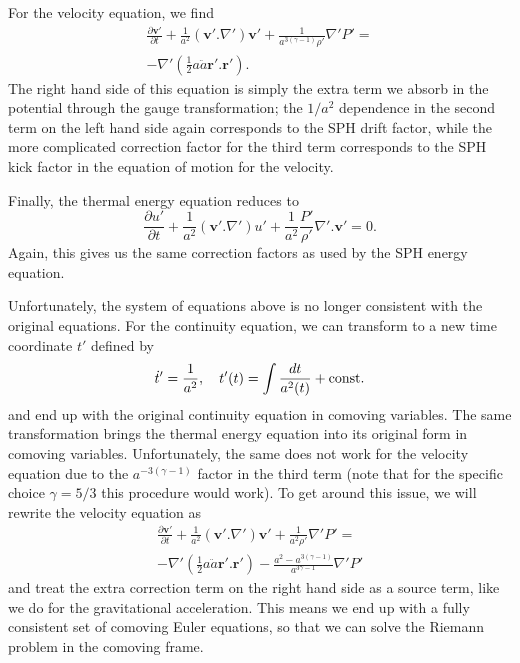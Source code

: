 For the velocity equation, we find
\begin{multline}
\frac{\partial{} \mathbf{v}'}{\partial{} t} + \frac{1}{a^2} \left( \mathbf{v}' .
\nabla{}' \right) \mathbf{v}' + \frac{1}{a^{3(\gamma{} - 1)}\rho{}'}
\nabla{}' P' = \\
- \nabla{}' \left( \frac{1}{2} a \ddot{a} \mathbf{r}'.\mathbf{r}'
\right).
\end{multline}
The right hand side of this equation is simply the extra term we absorb in the
potential through the gauge transformation; the $1/a^2$ dependence in the
second term on the left hand side again corresponds to the SPH drift factor,
while the more complicated correction factor for the third term corresponds
to the SPH kick factor in the equation of motion for the velocity.

Finally, the thermal energy equation reduces to
\begin{equation}
\frac{\partial{} u'}{\partial{} t} + \frac{1}{a^2} \left( \mathbf{v}' .
\nabla{}' \right) u' + \frac{1}{a^2} \frac{P'}{\rho{}'} \nabla{}' . \mathbf{v}'
= 0.
\end{equation}
Again, this gives us the same correction factors as used by the SPH energy
equation.

Unfortunately, the system of equations above is no longer consistent with the
original equations. For the continuity equation, we can transform to a new
time coordinate $t'$ defined by
\begin{equation}
\dot{t}' = \frac{1}{a^2}, \quad{} t'(t) = \int \frac{dt}{a^2(t)} + {\rm{}const.}
\end{equation}
and end up with the original continuity equation in comoving variables. The
same transformation brings the thermal energy equation into its original form
in comoving variables. Unfortunately, the same does not work for the velocity
equation due to the $a^{-3(\gamma{}-1)}$ factor in the third term (note that
for the specific choice $\gamma{}=5/3$ this procedure would work).
To get around this issue, we will rewrite the velocity equation as
\begin{multline}
\frac{\partial{} \mathbf{v}'}{\partial{} t} + \frac{1}{a^2} \left( \mathbf{v}' .
\nabla{}' \right) \mathbf{v}' + \frac{1}{a^2\rho{}'}
\nabla{}' P' = \\
- \nabla{}' \left( \frac{1}{2} a \ddot{a} \mathbf{r}'.\mathbf{r}'
\right) - \frac{a^2 - a^{3(\gamma{}-1)}}{a^{3\gamma{} - 1}} \nabla{}'P'
\end{multline}
and treat the extra correction term on the right hand side as a source term,
like we do for the gravitational acceleration. This means we end up with
a fully consistent set of comoving Euler equations, so that we can solve the
Riemann problem in the comoving frame.

